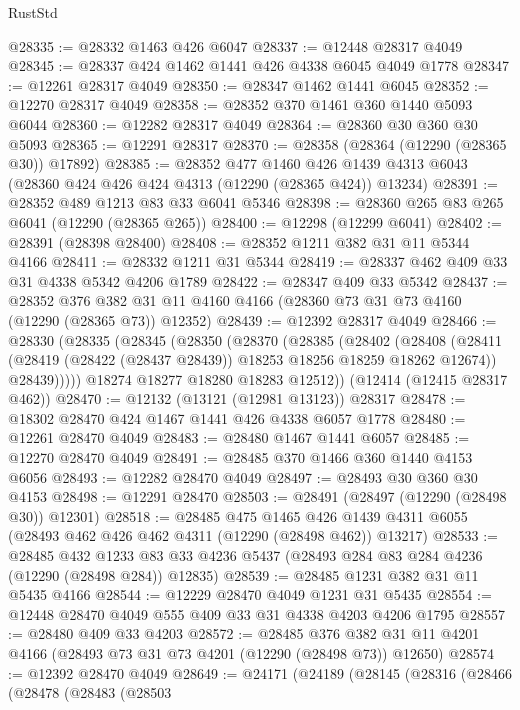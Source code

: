 \begin{lexlean}{RustStd}
\begin{coremodule}
@28335 := @28332 @1463 @426 @6047
@28337 := @12448 @28317 @4049
@28345 := @28337 @424 @1462 @1441 @426 @4338 @6045 @4049 @1778
@28347 := @12261 @28317 @4049
@28350 := @28347 @1462 @1441 @6045
@28352 := @12270 @28317 @4049
@28358 := @28352 @370 @1461 @360 @1440 @5093 @6044
@28360 := @12282 @28317 @4049
@28364 := @28360 @30 @360 @30 @5093
@28365 := @12291 @28317
@28370 := @28358 (@28364 (@12290 (@28365 @30)) @17892)
@28385 := @28352
    @477
    @1460
    @426
    @1439
    @4313
    @6043
    (@28360 @424 @426 @424 @4313 (@12290 (@28365 @424)) @13234)
@28391 := @28352 @489 @1213 @83 @33 @6041 @5346
@28398 := @28360 @265 @83 @265 @6041 (@12290 (@28365 @265))
@28400 := @12298 (@12299 @6041)
@28402 := @28391 (@28398 @28400)
@28408 := @28352 @1211 @382 @31 @11 @5344 @4166
@28411 := @28332 @1211 @31 @5344
@28419 := @28337 @462 @409 @33 @31 @4338 @5342 @4206 @1789
@28422 := @28347 @409 @33 @5342
@28437 := @28352
    @376
    @382
    @31
    @11
    @4160
    @4166
    (@28360 @73 @31 @73 @4160 (@12290 (@28365 @73)) @12352)
@28439 := @12392 @28317 @4049
@28466 := @28330
    (@28335
      (@28345
        (@28350
          (@28370
            (@28385
              (@28402
                (@28408
                  (@28411 (@28419 (@28422 (@28437 @28439)) @18253 @18256 @18259 @18262 @12674))
                  @28439)))))
        @18274
        @18277
        @18280
        @18283
        @12512))
    (@12414 (@12415 @28317 @462))
@28470 := @12132 (@13121 (@12981 @13123)) @28317
@28478 := @18302 @28470 @424 @1467 @1441 @426 @4338 @6057 @1778
@28480 := @12261 @28470 @4049
@28483 := @28480 @1467 @1441 @6057
@28485 := @12270 @28470 @4049
@28491 := @28485 @370 @1466 @360 @1440 @4153 @6056
@28493 := @12282 @28470 @4049
@28497 := @28493 @30 @360 @30 @4153
@28498 := @12291 @28470
@28503 := @28491 (@28497 (@12290 (@28498 @30)) @12301)
@28518 := @28485
    @475
    @1465
    @426
    @1439
    @4311
    @6055
    (@28493 @462 @426 @462 @4311 (@12290 (@28498 @462)) @13217)
@28533 := @28485
    @432
    @1233
    @83
    @33
    @4236
    @5437
    (@28493 @284 @83 @284 @4236 (@12290 (@28498 @284)) @12835)
@28539 := @28485 @1231 @382 @31 @11 @5435 @4166
@28544 := @12229 @28470 @4049 @1231 @31 @5435
@28554 := @12448 @28470 @4049 @555 @409 @33 @31 @4338 @4203 @4206 @1795
@28557 := @28480 @409 @33 @4203
@28572 := @28485
    @376
    @382
    @31
    @11
    @4201
    @4166
    (@28493 @73 @31 @73 @4201 (@12290 (@28498 @73)) @12650)
@28574 := @12392 @28470 @4049
@28649 := @24171
    (@24189
      (@28145
        (@28316
          (@28466
            (@28478
              (@28483
                (@28503

\end{coremodule}
\end{lexlean}
